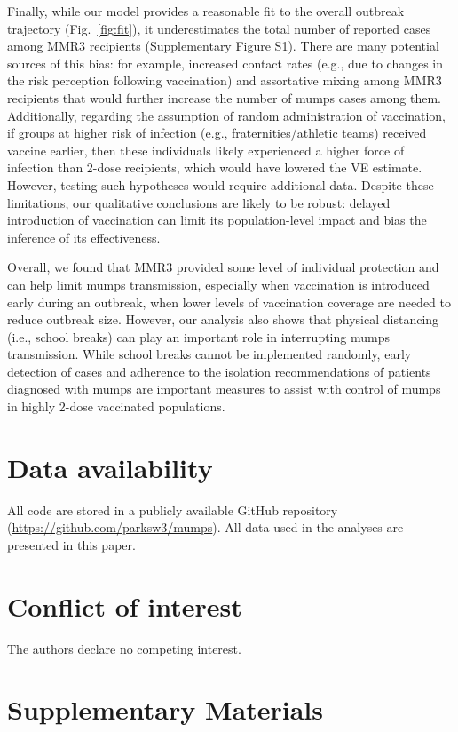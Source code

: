 \documentclass[12pt]{article}
\newcommand{\fref}[1]{Fig.~\ref{fig:#1}}
\begin{document}
Finally, while our model provides a reasonable fit to the overall outbreak trajectory (\fref{fit}), it underestimates the total number of reported cases among MMR3 recipients (Supplementary Figure S1).
There are many potential sources of this bias: for example, increased contact rates (e.g., due to changes in the risk perception following vaccination) and assortative mixing among MMR3 recipients that would further increase the number of mumps cases among them.
Additionally, regarding the assumption of random administration of vaccination, if groups at higher risk of infection (e.g., fraternities/athletic teams) received vaccine earlier, then these individuals likely experienced a higher force of infection than 2-dose recipients, which would have lowered the VE estimate. 
However, testing such hypotheses would require additional data.
Despite these limitations, our qualitative conclusions are likely to be robust: delayed introduction of vaccination can limit its population-level impact and bias the inference of its effectiveness.

Overall, we found that MMR3 provided some level of individual protection and can help limit mumps transmission, especially when vaccination is introduced early during an outbreak, when lower levels of vaccination coverage are needed to reduce outbreak size.  
However, our analysis also shows that physical distancing (i.e., school breaks) can play an important role in interrupting mumps transmission. 
While school breaks cannot be implemented randomly, early detection of cases and adherence to the isolation recommendations of patients diagnosed with mumps are important measures to assist with control of mumps in highly 2-dose vaccinated populations.

\section*{Data availability}

All code are stored in a publicly available GitHub repository (\url{https://github.com/parksw3/mumps}). All data used in the analyses are presented in this paper.

\section*{Conflict of interest}

The authors declare no competing interest.

\pagebreak

\section*{Supplementary Materials}
\end{document}
